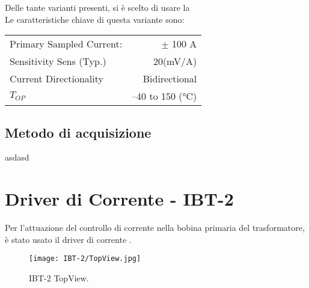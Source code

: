 \noindent
Delle tante varianti presenti, si è scelto di usare la \\
Le caratteristiche chiave di questa variante sono:
\begin{center}
	\begin{tabular}[t]{|l r|}
		\hline
		Primary Sampled Current: & $\pm$ 100 A     \\
		Sensitivity Sens (Typ.)  & 20(mV/A)        \\
		Current Directionality   & Bidirectional   \\
		$T_{OP}$                 & –40 to 150 (°C) \\
		\hline
	\end{tabular}
\end{center}






\subsection{Metodo di acquisizione}
asdasd

\newpage

\section{Driver di Corrente - IBT-2}\label{CurrentDriver}
Per l'attuazione del controllo di corrente nella bobina primaria del trasformatore, è stato usato il driver di corrente \cite{IBT-2} .

\begin{figure}[h]
	\centering
	\texttt{[image: IBT-2/TopView.jpg]}
	\caption[Driver Motori IBT-2 TopView \& PinOut]{IBT-2 TopView.}
\end{figure}

